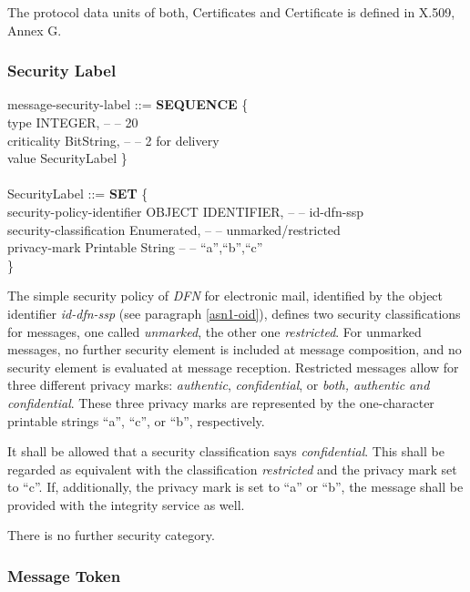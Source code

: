 The protocol data units of both, Certificates and Certificate is defined in
X.509, Annex G.

\subsubsection{Security Label}
\label{asn1-seclab}

{\small
\btab
\1 message-security-label ::= {\bf SEQUENCE} \{ \\
\2         type \3         [0] INTEGER, -- -- 20 \\
\2         criticality \3  [1] BitString, -- -- 2 for delivery \\
\2         value \3        [2] SecurityLabel \} \\
\\
\1 SecurityLabel ::= {\bf SET} \{ \\
\2         security-policy-identifier \3 OBJECT IDENTIFIER, -- -- id-dfn-ssp \\
\2         security-classification \3 Enumerated, -- -- unmarked/restricted \\
\2         privacy-mark \3            Printable String -- -- ``a'',``b'',``c'' \\
\2         \}
\\
\etab
}

The simple security policy of {\em DFN} for electronic mail,
identified by the
object identifier {\em id-dfn-ssp} (see paragraph \ref{asn1-oid}),
defines two security classifications for messages,
one called {\em unmarked}, the other one {\em restricted}.
For unmarked messages, no further security element is included
at message composition, and no security element is evaluated
at message reception.
Restricted messages allow for three different privacy marks:
{\em authentic}, {\em confidential}, or {\em both, authentic and confidential}.
These three privacy marks are represented by the one-character
printable strings ``a'', ``c'', or ``b'', respectively.

It shall be allowed that a security classification says {\em confidential}.
This shall be regarded as equivalent with the classification
{\em restricted} and the privacy mark set to ``c''.
If, additionally, the privacy mark is set to ``a'' or ``b'',
the message shall be provided with the integrity service as well.

There is no further security category.

\subsubsection{Message Token}
\label{asn1-token}

